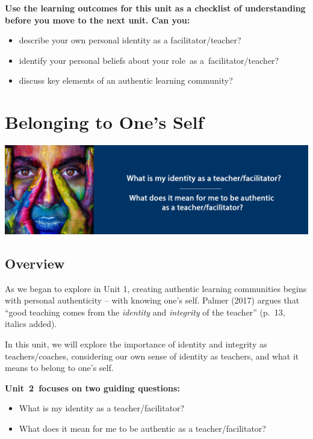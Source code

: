 \documentclass[
]{book}
\providecommand{\tightlist}{%
  \setlength{\itemsep}{0pt}\setlength{\parskip}{0pt}}
\begin{document}
\begin{progress}
\textbf{Use the learning outcomes for this unit as a checklist of understanding before you move to the next unit. Can you:}

\begin{itemize}
\tightlist
\item
  describe your own personal identity as a facilitator/teacher?
\item
  identify your personal beliefs about your role~as a~facilitator/teacher?
\item
  discuss key elements of an authentic learning community?
\end{itemize}
\end{progress}

\hypertarget{belonging-to-ones-self}{%
\chapter{Belonging to One's Self}\label{belonging-to-ones-self}}

\includegraphics{assets/unit2/LDRS664-BannerUnit2-v3.jpg}

\hypertarget{overview-1}{%
\section*{Overview}\label{overview-1}}

As we began to explore in Unit 1, creating authentic learning communities begins with personal authenticity -- with knowing one's self. Palmer (2017) argues that ``good teaching comes from the \emph{identity} and \emph{integrity} of the teacher'' (p.~13, italics added).

In this unit, we will explore the importance of identity and integrity as teachers/coaches, considering our own sense of identity as teachers, and what it means to belong to one's self.

\textbf{Unit~2~focuses on two guiding questions:}

\begin{itemize}
\tightlist
\item
  What is my identity as a teacher/facilitator?\\
\item
  What does it mean for me to be authentic as a teacher/facilitator?
\end{itemize}
\end{document}
